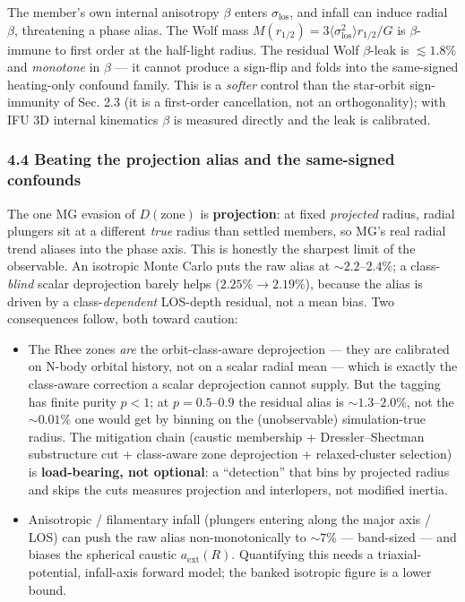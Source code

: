 \documentclass[
]{article}
\providecommand{\tightlist}{%
  \setlength{\itemsep}{0pt}\setlength{\parskip}{0pt}}
\begin{document}
The member's own internal anisotropy \(\beta\) enters
\(\sigma_\mathrm{los}\), and infall can induce radial \(\beta\),
threatening a phase alias. The Wolf mass
\(M(r_{1/2})=3\langle\sigma_\mathrm{los}^2\rangle r_{1/2}/G\) is
\(\beta\)-immune to first order at the half-light radius. The residual
Wolf \(\beta\)-leak is \(\lesssim1.8\%\) and \emph{monotone} in
\(\beta\) --- it cannot produce a sign-flip and folds into the
same-signed heating-only confound family. This is a \emph{softer}
control than the star-orbit sign-immunity of Sec. 2.3 (it is a
first-order cancellation, not an orthogonality); with IFU 3D internal
kinematics \(\beta\) is measured directly and the leak is calibrated.

\subsubsection{4.4 Beating the projection alias and the same-signed
confounds}\label{beating-the-projection-alias-and-the-same-signed-confounds}

The one MG evasion of \(D(\text{zone})\) is \textbf{projection}: at
fixed \emph{projected} radius, radial plungers sit at a different
\emph{true} radius than settled members, so MG's real radial trend
aliases into the phase axis. This is honestly the sharpest limit of the
observable. An isotropic Monte Carlo puts the raw alias at
\(\sim2.2\)--\(2.4\%\); a class-\emph{blind} scalar deprojection barely
helps (\(2.25\%\to2.19\%\)), because the alias is driven by a
class-\emph{dependent} LOS-depth residual, not a mean bias. Two
consequences follow, both toward caution:

\begin{itemize}
\tightlist
\item
  The Rhee zones \emph{are} the orbit-class-aware deprojection --- they
  are calibrated on N-body orbital history, not on a scalar radial mean
  --- which is exactly the class-aware correction a scalar deprojection
  cannot supply. But the tagging has finite purity \(p<1\); at
  \(p=0.5\)--\(0.9\) the residual alias is \(\sim1.3\)--\(2.0\%\), not
  the \(\sim0.01\%\) one would get by binning on the (unobservable)
  simulation-true radius. The mitigation chain (caustic membership +
  Dressler--Shectman substructure cut + class-aware zone deprojection +
  relaxed-cluster selection) is \textbf{load-bearing, not optional}: a
  ``detection'' that bins by projected radius and skips the cuts
  measures projection and interlopers, not modified inertia.
\item
  Anisotropic / filamentary infall (plungers entering along the major
  axis / LOS) can push the raw alias non-monotonically to \(\sim7\%\)
  --- band-sized --- and biases the spherical caustic
  \(a_\mathrm{ext}(R)\). Quantifying this needs a triaxial-potential,
  infall-axis forward model; the banked isotropic figure is a lower
  bound.
\end{itemize}
\end{document}
